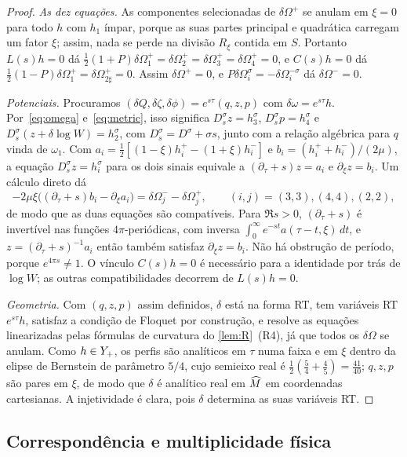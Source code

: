 \begin{proof}
\emph{As dez equações.} As componentes selecionadas de $\delta\Omega^+$ se anulam em $\xi=0$ para todo $h$ com $h_1$
ímpar, porque as suas partes principal e quadrática carregam um fator $\xi$; assim, nada se perde na divisão
$R_\xi$ contida em $S$. Portanto $L(s)h=0$ dá $\tfrac12(1+P)\delta\Omega_1^+=\delta\Omega_2^+=\delta\Omega_3^+=
\delta\Omega_4^+=0$, e $C(s)h=0$ dá $\tfrac12(1-P)\delta\Omega_1^+=\delta\Omega_{2\sharp}^+=0$. Assim
$\delta\Omega^+=0$, e $P\delta\Omega_i^\sigma=-\delta\Omega_i^{-\sigma}$ dá $\delta\Omega^-=0$.

\emph{Potenciais.} Procuramos $(\delta Q,\delta\zeta,\delta\phi)=e^{s\tau}(q,z,p)$ com
$\delta\omega=e^{s\tau}h$. Por~\eqref{eq:omega} e~\eqref{eq:metric}, isso significa
$D^\sigma_s z=h_3^\sigma$, $D_s^\sigma p=h_4^\sigma$ e $D_s^\sigma(z+\delta\log W)=h_2^\sigma$, com
$D_s^\sigma=D^\sigma+\sigma s$, junto com a relação algébrica para $q$ vinda de $\omega_1$. Com
$a_i=\tfrac12[(1-\xi)h_i^+-(1+\xi)h_i^-]$ e $b_i=(h_i^++h_i^-)/(2\mu)$, a equação $D_s^\sigma z=h_i^\sigma$ para
os dois sinais equivale a $(\partial_\tau+s)z=a_i$ e $\partial_\xi z=b_i$. Um cálculo direto dá
\[
  -2\mu\xi\big((\partial_\tau+s)b_i-\partial_\xi a_i\big)=\delta\Omega_j^--\delta\Omega_j^+,\qquad (i,j)=(3,3),(4,4),(2,2),
\]
de modo que as duas equações são compatíveis. Para $\Re s>0$, $(\partial_\tau+s)$ é invertível nas funções
$4\pi$-periódicas, com inversa $\int_0^\infty e^{-st}a(\tau-t,\xi)\,dt$, e $z=(\partial_\tau+s)^{-1}a_i$ então também
satisfaz $\partial_\xi z=b_i$. Não há obstrução de período, porque $e^{4\pi s}\neq1$. O vínculo
$C(s)h=0$ é necessário para a identidade por trás de $\log W$; as outras compatibilidades decorrem de $L(s)h=0$.

\emph{Geometria.} Com $(q,z,p)$ assim definidos, $\delta$ está na forma RT, tem variáveis RT $e^{s\tau}h$, satisfaz
a condição de Floquet por construção, e resolve as equações linearizadas pelas fórmulas de curvatura do
\cref{lem:R}~(R4), já que todos os $\delta\Omega$ se anulam. Como $h\in Y_{+}$, os perfis são analíticos em $\tau$ numa
faixa e em $\xi$ dentro da elipse de Bernstein de parâmetro $5/4$, cujo semieixo real é
$\tfrac12(\tfrac54+\tfrac45)=\tfrac{41}{40}$; $q,z,p$ são pares em $\xi$, de modo que $\delta$ é analítico real em $\widehat M$ em
coordenadas cartesianas. A injetividade é clara, pois $\delta$ determina as suas variáveis RT.
\end{proof}

\subsection{Correspondência e multiplicidade física}\label{sec:physical-count}

